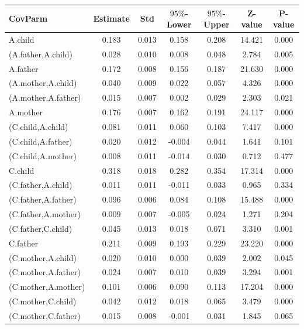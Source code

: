 \documentclass[11pt,a5paper,twoside]{book}
\begin{document}
\begin{center}

\begin{longtable}{lcccccc}
  \hline
CovParm & Estimate & Std & $95\%$-Lower & $95\%$-Upper & Z-value & P-value \\ 
  \hline
 A.child  & 0.183 & 0.013 & 0.158 & 0.208 & 14.421 & 0.000 \\ 
   (A.father,A.child)  & 0.028 & 0.010 & 0.008 & 0.048 & 2.784 & 0.005 \\ 
   A.father  & 0.172 & 0.008 & 0.156 & 0.187 & 21.630 & 0.000 \\ 
   (A.mother,A.child)  & 0.040 & 0.009 & 0.022 & 0.057 & 4.326 & 0.000 \\ 
   (A.mother,A.father)  & 0.015 & 0.007 & 0.002 & 0.029 & 2.303 & 0.021 \\ 
   A.mother  & 0.176 & 0.007 & 0.162 & 0.191 & 24.117 & 0.000 \\ 
   (C.child,A.child)  & 0.081 & 0.011 & 0.060 & 0.103 & 7.417 & 0.000 \\ 
   (C.child,A.father)  & 0.020 & 0.012 & -0.004 & 0.044 & 1.641 & 0.101 \\ 
   (C.child,A.mother)  & 0.008 & 0.011 & -0.014 & 0.030 & 0.712 & 0.477 \\ 
   C.child  & 0.318 & 0.018 & 0.282 & 0.354 & 17.314 & 0.000 \\ 
   (C.father,A.child)  & 0.011 & 0.011 & -0.011 & 0.033 & 0.965 & 0.334 \\ 
   (C.father,A.father)  & 0.096 & 0.006 & 0.084 & 0.108 & 15.488 & 0.000 \\ 
   (C.father,A.mother)  & 0.009 & 0.007 & -0.005 & 0.024 & 1.271 & 0.204 \\ 
   (C.father,C.child)  & 0.045 & 0.013 & 0.018 & 0.071 & 3.310 & 0.001 \\ 
   C.father  & 0.211 & 0.009 & 0.193 & 0.229 & 23.220 & 0.000 \\ 
   (C.mother,A.child)  & 0.020 & 0.010 & 0.000 & 0.039 & 2.002 & 0.045 \\ 
   (C.mother,A.father)  & 0.024 & 0.007 & 0.010 & 0.039 & 3.294 & 0.001 \\ 
   (C.mother,A.mother)  & 0.101 & 0.006 & 0.090 & 0.113 & 17.204 & 0.000 \\ 
   (C.mother,C.child)  & 0.042 & 0.012 & 0.018 & 0.065 & 3.479 & 0.000 \\ 
   (C.mother,C.father)  & 0.015 & 0.008 & -0.001 & 0.031 & 1.845 & 0.065 \\ 

\end{longtable}
\end{center}
\end{document}
